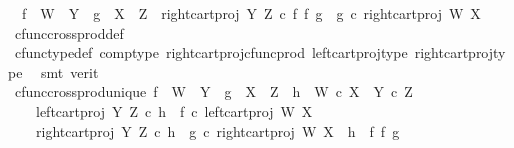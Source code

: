 \begin{isabellebody}
\ \ {\isachardoublequoteopen}f\ {\isacharcolon}{\kern0pt}\ W\ {\isasymrightarrow}\ Y\ {\isasymLongrightarrow}\ g\ {\isacharcolon}{\kern0pt}\ X\ {\isasymrightarrow}\ Z\ {\isasymLongrightarrow}\ right{\isacharunderscore}{\kern0pt}cart{\isacharunderscore}{\kern0pt}proj\ Y\ Z\ {\isasymcirc}\isactrlsub c\ f\ {\isasymtimes}\isactrlsub f\ g\ {\isacharequal}{\kern0pt}\ g\ {\isasymcirc}\isactrlsub c\ right{\isacharunderscore}{\kern0pt}cart{\isacharunderscore}{\kern0pt}proj\ W\ X{\isachardoublequoteclose}\isanewline
%
\isadelimproof
\ \ %
\endisadelimproof
%
\isatagproof
{}\isamarkupfalse%
\ cfunc{\isacharunderscore}{\kern0pt}cross{\isacharunderscore}{\kern0pt}prod{\isacharunderscore}{\kern0pt}def\isanewline
\ \ \isamarkupfalse%
\ cfunc{\isacharunderscore}{\kern0pt}type{\isacharunderscore}{\kern0pt}def\ comp{\isacharunderscore}{\kern0pt}type\ right{\isacharunderscore}{\kern0pt}cart{\isacharunderscore}{\kern0pt}proj{\isacharunderscore}{\kern0pt}cfunc{\isacharunderscore}{\kern0pt}prod\ left{\isacharunderscore}{\kern0pt}cart{\isacharunderscore}{\kern0pt}proj{\isacharunderscore}{\kern0pt}type\ right{\isacharunderscore}{\kern0pt}cart{\isacharunderscore}{\kern0pt}proj{\isacharunderscore}{\kern0pt}type\ \isamarkupfalse%
\ {\isacharparenleft}{\kern0pt}smt\ {\isacharparenleft}{\kern0pt}verit{\isacharparenright}{\kern0pt}{\isacharparenright}{\kern0pt}%
\endisatagproof
{\isafoldproof}%
%
\isadelimproof
\isanewline
%
\endisadelimproof
\isanewline
{}\isamarkupfalse%
\ cfunc{\isacharunderscore}{\kern0pt}cross{\isacharunderscore}{\kern0pt}prod{\isacharunderscore}{\kern0pt}unique{\isacharcolon}{\kern0pt}\ {\isachardoublequoteopen}f\ {\isacharcolon}{\kern0pt}\ W\ {\isasymrightarrow}\ Y\ {\isasymLongrightarrow}\ g\ {\isacharcolon}{\kern0pt}\ X\ {\isasymrightarrow}\ Z\ {\isasymLongrightarrow}\ h\ {\isacharcolon}{\kern0pt}\ W\ {\isasymtimes}\isactrlsub c\ X\ {\isasymrightarrow}\ Y\ {\isasymtimes}\isactrlsub c\ Z\ {\isasymLongrightarrow}\isanewline
\ \ \ \ left{\isacharunderscore}{\kern0pt}cart{\isacharunderscore}{\kern0pt}proj\ Y\ Z\ {\isasymcirc}\isactrlsub c\ h\ {\isacharequal}{\kern0pt}\ f\ {\isasymcirc}\isactrlsub c\ left{\isacharunderscore}{\kern0pt}cart{\isacharunderscore}{\kern0pt}proj\ W\ X\ {\isasymLongrightarrow}\isanewline
\ \ \ \ right{\isacharunderscore}{\kern0pt}cart{\isacharunderscore}{\kern0pt}proj\ Y\ Z\ {\isasymcirc}\isactrlsub c\ h\ {\isacharequal}{\kern0pt}\ g\ {\isasymcirc}\isactrlsub c\ right{\isacharunderscore}{\kern0pt}cart{\isacharunderscore}{\kern0pt}proj\ W\ X\ {\isasymLongrightarrow}\ h\ {\isacharequal}{\kern0pt}\ f\ {\isasymtimes}\isactrlsub f\ g{\isachardoublequoteclose}\isanewline

\end{isabellebody}

